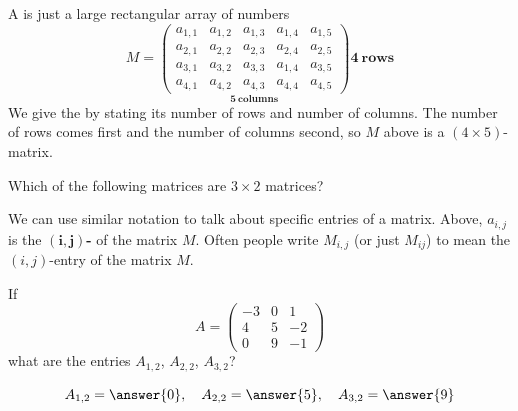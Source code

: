 \documentclass{ximera}
\begin{document}
A  is just a large rectangular array of numbers
\[
M =
\underset{\displaystyle\boldsymbol{5}~\textbf{columns}}{\begin{pmatrix}
  a_{1,1} & a_{1,2} & a_{1,3} & a_{1,4} & a_{1,5} \\
  a_{2,1} & a_{2,2} & a_{2,3} & a_{2,4} & a_{2,5} \\
  a_{3,1} & a_{3,2} & a_{3,3} & a_{1,4} & a_{3,5} \\
  a_{4,1} & a_{4,2} & a_{4,3} & a_{4,4} & a_{4,5}
\end{pmatrix}}
\boldsymbol{4}~\textbf {rows}
\]
We give the  by stating its number of rows
and number of columns. The number of rows comes first and the number
of columns second, so $M$ above is a $(4\times 5)$-matrix.
\begin{question}
  Which of the following matrices are $3\times 2$ matrices?
  \begin{selectAll}
  \pdfOnly{\end{multicols}}
  \end{selectAll}
\end{question}


We can use similar notation to talk about specific entries of a
matrix. Above, $a_{i,j}$ is the $\boldsymbol{(i,j)}${\bf-}
of the matrix $M$. Often people write $M_{i,j}$ (or just $M_{ij}$) to
mean the $(i,j)$-entry of the matrix $M$.



\begin{question}
  If
  \[A= \begin{pmatrix}
  -3 & 0 & 1\\
  4 & 5 & -2\\
  0 & 9 & -1
  \end{pmatrix}
  \]
  what are the entries $A_{1,2}$, $A_{2,2}$, $A_{3,2}$?
  \begin{prompt}
    \[
    A_{1,2} = \answer{0}, \quad A_{2,2} = \answer{5}, \quad A_{3,2} = \answer{9}
    \]
  \end{prompt}
\end{question}
\end{document}
